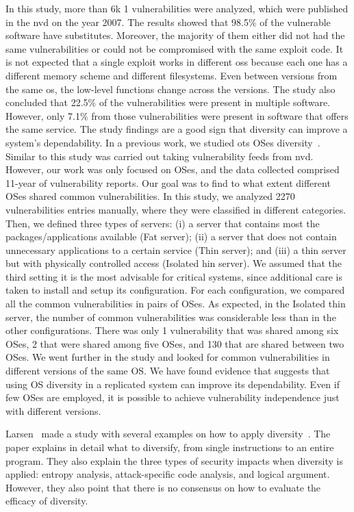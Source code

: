 In this study, more than 6k 1 vulnerabilities were analyzed, which were published in the \gls{nvd} on the year 2007. 
The results showed that 98.5$\%$ of the vulnerable software have substitutes. 
Moreover, the majority of them either did not had the same vulnerabilities or could not be compromised with the same exploit code. 
It is not expected that a single exploit works in different \glspl{os} because each one has a different memory scheme and different filesystems. 
Even between versions from the same \gls{os}, the low-level functions change across the versions. 
The study also concluded that 22.5$\%$ of the vulnerabilities were present in multiple software. 
However, only 7.1$\%$ from those vulnerabilities were present in software that offers the same service. 
The study findings are a good sign that diversity can improve a system’s dependability.
In a previous work, we studied \gls{ots} OSes diversity~\cite{Garcia:2014}. 
Similar to \cite{Han:2009} this study was carried out taking vulnerability feeds from \gls{nvd}. 
However, our work was only focused on OSes, and the data collected comprised 11-year of vulnerability reports. 
Our goal was to find to what extent different OSes shared common vulnerabilities. 
In this study, we analyzed 2270 vulnerabilities entries manually, where they were classified in different categories. 
Then, we defined three types of servers: (i) a server that contains most the packages/applications available (Fat server); (ii) a server that does not contain unnecessary applications to a certain
service (Thin server); and (iii) a thin server but with physically controlled access (Isolated hin server). 
We assumed that the third setting it is the most advisable for critical systems, since additional care is taken to install and setup its configuration. 
For each configuration, we compared all the common vulnerabilities in pairs of OSes. 
As expected, in the Isolated thin server, the number of common vulnerabilities was considerable less than in the other configurations. 
There was only 1 vulnerability that was shared among six OSes, 2 that were shared among five OSes, and 130 that are shared between two OSes. 
We went further in the study and looked for common vulnerabilities in different versions of the same OS. 
We have found evidence that suggests that using OS diversity in a replicated system can improve its dependability. 
Even if few OSes are employed, it is possible to achieve vulnerability independence just with different versions.



Larsen~\etal{} made a study with several examples on how to apply diversity~\cite{Larsen:2014,Larsen:2015}. 
The paper explains in detail what to diversify, from single instructions to an entire program. 
They also explain the three types of security impacts when diversity is applied: entropy analysis, attack-specific code analysis, and logical argument. 
However, they also point that there is no consensus on how to evaluate the efficacy of diversity. 

